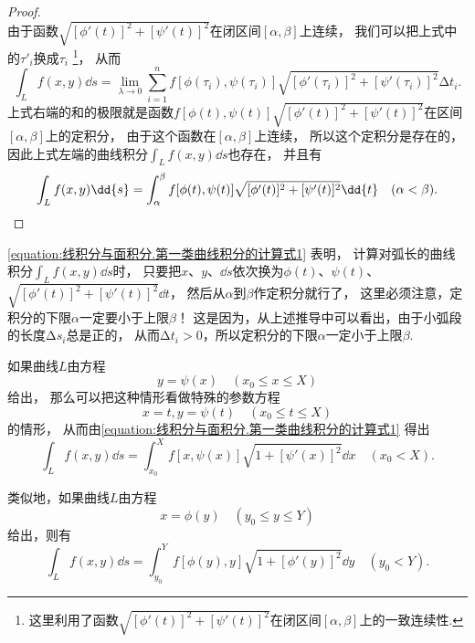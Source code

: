 \begin{theorem}
\begin{proof}
\begin{equation*}
\end{equation*}
由于函数\(\sqrt{[\phi'(t)]^2+[\psi'(t)]^2}\)在闭区间\([\alpha,\beta]\)上连续，
我们可以把上式中的\(\tau'_i\)换成\(\tau_i\)
\footnote{这里利用了函数\(\sqrt{[\phi'(t)]^2+[\psi'(t)]^2}\)在闭区间\([\alpha,\beta]\)上的一致连续性.}，
从而\begin{equation*}
	\int_L f(x,y) \dd{s}
	= \lim_{\lambda\to0} \sum_{i=1}^n f[\phi(\tau_i),\psi(\tau_i)] \sqrt{[\phi'(\tau_i)]^2+[\psi'(\tau_i)]^2} \increment t_i.
\end{equation*}
上式右端的和的极限就是函数\(f[\phi(t),\psi(t)] \sqrt{[\phi'(t)]^2+[\psi'(t)]^2}\)在区间\([\alpha,\beta]\)上的定积分，
由于这个函数在\([\alpha,\beta]\)上连续，
所以这个定积分是存在的，
因此上式左端的曲线积分\(\int_L f(x,y) \dd{s}\)也存在，
并且有\begin{equation*}
	\int_L f(x,y) \dd{s}
	= \int_\alpha^\beta f[\phi(t),\psi(t)] \sqrt{[\phi'(t)]^2+[\psi'(t)]^2} \dd{t}
	\quad(\alpha<\beta).
	\qedhere
\end{equation*}
\end{proof}
\end{theorem}
\cref{equation:线积分与面积分.第一类曲线积分的计算式1} 表明，
计算对弧长的曲线积分\(\int_L f(x,y) \dd{s}\)时，
只要把\(x\)、\(y\)、\(\dd{s}\)依次换为\(\phi(t)\)、\(\psi(t)\)、\(\sqrt{[\phi'(t)]^2+[\psi'(t)]^2} \dd{t}\)，
然后从\(\alpha\)到\(\beta\)作定积分就行了，
这里必须注意，定积分的下限\(\alpha\)一定要小于上限\(\beta\)！
这是因为，从上述推导中可以看出，由于小弧段的长度\(\increment s_i\)总是正的，
从而\(\increment t_i > 0\)，所以定积分的下限\(\alpha\)一定小于上限\(\beta\).

如果曲线\(L\)由方程\begin{equation*}
	y = \psi(x)
	\quad(x_0 \leq x \leq X)
\end{equation*}给出，
那么可以把这种情形看做特殊的参数方程\begin{equation*}
	x = t,
	y = \psi(t)
	\quad(x_0 \leq t \leq X)
\end{equation*}的情形，
从而由\cref{equation:线积分与面积分.第一类曲线积分的计算式1} 得出\begin{equation}
	\int_L f(x,y) \dd{s}
	= \int_{x_0}^X f[x,\psi(x)] \sqrt{1+[\psi'(x)]^2} \dd{x}
	\quad(x_0 < X).
\end{equation}

类似地，如果曲线\(L\)由方程\begin{equation*}
	x = \phi(y)
	\quad(y_0 \leq y \leq Y)
\end{equation*}给出，则有
	\begin{equation}
		\int_L f(x,y) \dd{s}
		= \int_{y_0}^Y f[\phi(y),y] \sqrt{1+[\phi'(y)]^2} \dd{y}
	\quad(y_0 < Y).
\end{equation}

